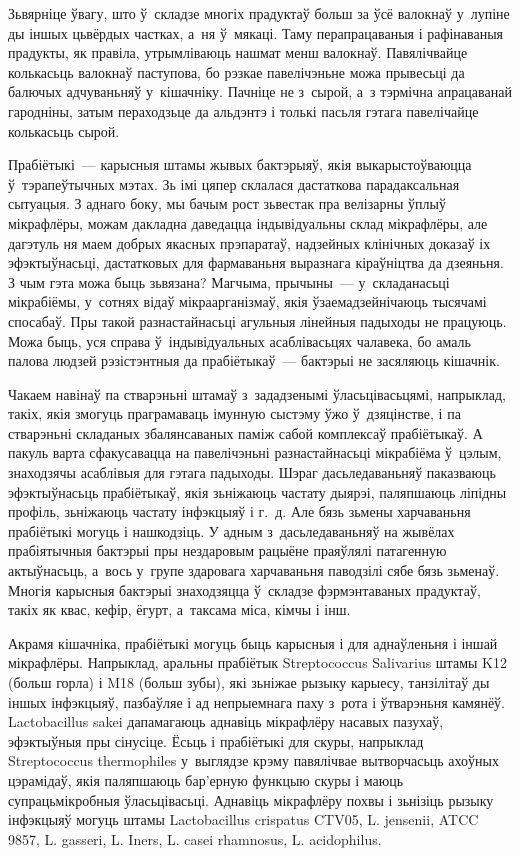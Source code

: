 Зьвярніце ўвагу, што ў~складзе многіх прадуктаў больш за ўсё валокнаў у~лупіне ды іншых цьвёрдых частках, а~ня ў~мякаці. Таму перапрацаваныя і рафінаваныя прадукты, як правіла, утрымліваюць нашмат менш валокнаў. Павялічвайце колькасьць валокнаў паступова, бо рэзкае павелічэньне можа прывесьці да балючых адчуваньняў у~кішачніку. Пачніце не з~сырой, а~з тэрмічна апрацаванай гародніны, затым пераходзьце да альдэнтэ і толькі пасьля гэтага павелічайце колькасьць сырой.

Прабіётыкі~--- карысныя штамы жывых бактэрыяў, якія выкарыстоўваюцца ў~тэрапеўтычных мэтах. Зь імі цяпер склалася дастаткова парадаксальная сытуацыя. З аднаго боку, мы бачым рост зьвестак пра велізарны ўплыў мікрафлёры, можам дакладна даведацца індывідуальны склад мікрафлёры, але дагэтуль ня маем добрых якасных прэпаратаў, надзейных клінічных доказаў іх эфэктыўнасьці, дастатковых для фармаваньня выразнага кіраўніцтва да дзеяньня. З чым гэта можа быць зьвязана? Магчыма, прычыны~--- у~складанасьці мікрабіёмы, у~сотнях відаў мікраарганізмаў, якія ўзаемадзейнічаюць тысячамі спосабаў. Пры такой разнастайнасьці агульныя лінейныя падыходы не працуюць. Можа быць, уся справа ў~індывідуальных асаблівасьцях чалавека, бо амаль палова людзей рэзістэнтныя да прабіётыкаў~--- бактэрыі не засяляюць кішачнік.

Чакаем навінаў па стварэньні штамаў з~зададзенымі ўласьцівасьцямі, напрыклад, такіх, якія змогуць праграмаваць імунную сыстэму ўжо ў~дзяцінстве, і па стварэньні складаных збалянсаваных паміж сабой комплексаў прабіётыкаў. А пакуль варта сфакусавацца на павелічэньні разнастайнасьці мікрабіёма ў~цэлым, знаходзячы асаблівыя для гэтага падыходы. Шэраг дасьледаваньняў паказваюць эфэктыўнасьць прабіётыкаў, якія зьніжаюць частату дыярэі, паляпшаюць ліпідны профіль, зьніжаюць частату інфэкцыяў і г.~д. Але бязь зьмены харчаваньня прабіётыкі могуць і нашкодзіць. У адным з~дасьледаваньняў на жывёлах прабіятычныя бактэрыі пры нездаровым рацыёне праяўлялі патагенную актыўнасьць, а~вось у~групе здаровага харчаваньня паводзілі сябе бязь зьменаў. Многія карысныя бактэрыі знаходзяцца ў~складзе фэрмэнтаваных прадуктаў, такіх як квас, кефір, ёгурт, а~таксама міса, кімчы і інш.

Акрамя кішачніка, прабіётыкі могуць быць карысныя і для аднаўленьня і іншай мікрафлёры. Напрыклад, аральны прабіётык Streptococcus Salivarius штамы K12 (больш горла) і M18 (больш зубы), які зьніжае рызыку карыесу, танзілітаў ды іншых інфэкцыяў, пазбаўляе і ад непрыемнага паху з~рота і ўтварэньня камянёў. Lactobacillus sakei дапамагаюць аднавіць мікрафлёру насавых пазухаў, эфэктыўныя пры сінусіце. Ёсьць і прабіётыкі для скуры, напрыклад Streptococcus thermophiles у~выглядзе крэму павялічвае вытворчасьць ахоўных цэрамідаў, якія паляпшаюць бар'ерную функцыю скуры і маюць супрацьмікробныя ўласьцівасьці. Аднавіць мікрафлёру похвы і зьнізіць рызыку інфэкцыяў могуць штамы Lactobacillus crispatus CTV05, L. jensenii, ATCC 9857, L. gasseri, L. Iners, L. casei rhamnosus, L. acidophilus.

